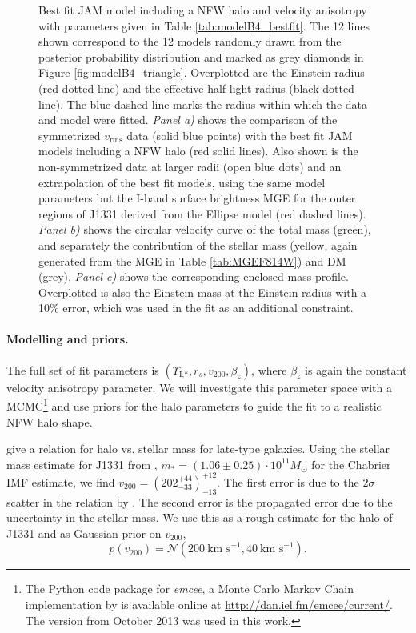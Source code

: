 \begin{figure}
\caption{ Best fit JAM model including a NFW halo and velocity anisotropy with parameters given in Table \ref{tab:modelB4_bestfit}. The 12 lines shown correspond to the 12 models randomly drawn from the posterior probability distribution and marked as grey diamonds in Figure \ref{fig:modelB4_triangle}. Overplotted are the Einstein radius (red dotted line) and the effective half-light radius (black dotted line). The blue dashed line marks the radius within which the data and model were fitted. \emph{Panel a)} shows the comparison of the symmetrized $v_\text{rms}$ data (solid blue points) with the best fit JAM models including a NFW halo (red solid lines). Also shown is the non-symmetrized data at larger radii (open blue dots) and an extrapolation of the best fit models, using the same model parameters but the I-band surface brightness MGE for the outer regions of J1331 derived from the Ellipse model (red dashed lines). \emph{Panel b)} shows the circular velocity curve of the total mass (green), and separately the contribution of the stellar mass (yellow, again generated from the MGE in Table \ref{tab:MGEF814W}) and DM (grey). \emph{Panel c)} shows the corresponding enclosed mass profile. Overplotted is also the Einstein mass at the Einstein radius with a 10\% error, which was used in the fit as an additional constraint.}
\label{fig:modelB4_models}
\end{figure}


\paragraph{Modelling and priors.} The full set of fit parameters is $(\Upsilon_\text{I,*},r_s,v_{200},\beta_z)$, where $\beta_z$ is again the constant velocity anisotropy parameter. We will investigate this parameter space with a MCMC\footnote{The Python code package for \emph{emcee}, a Monte Carlo Markov Chain implementation by \citet{emcee} is available online at \url{http://dan.iel.fm/emcee/current/}. The version from October 2013 was used in this work.} \citep{emcee} and use priors for the halo parameters to guide the fit to a realistic NFW halo shape.

\citet{Dutton10} give a relation for halo vs. stellar mass for late-type galaxies. Using the stellar mass estimate for J1331 from \citet{SWELLSI}, $m_* = (1.06 \pm 0.25) \cdot 10^{11} M_\odot$ for the Chabrier IMF estimate, we find ${v_{200}} = (202_{-33}^{+44})_{-13}^{+12}$. The first error is due to the $2\sigma$ scatter in the relation by \citet{Dutton10}. The second error is the propagated error due to the uncertainty in the stellar mass. We use this as a rough estimate for the halo of J1331 and as Gaussian prior on $v_{200}$, 
\begin{equation*}
p(v_{200}) = \mathscr{N}(200~\text{km s}^{-1},40~\text{km s}^{-1}).
\end{equation*}


